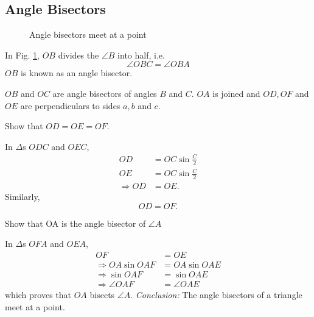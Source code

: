 \subsection{Angle Bisectors}

\begin{figure}[!ht]
	\begin{center}
		
		\resizebox{\columnwidth}{!}{}
	\end{center}
	\caption{Angle bisectors meet at a point}
	\label{ch3_angle_bisector}	
\end{figure}

\begin{definition}
	In Fig. \ref{ch3_angle_bisector}, $OB$ divides the  $\angle B$ into half, i.e.\begin{equation}
	\angle OBC = \angle OBA
	\end{equation}
	$OB$ is known as an angle bisector.
\end{definition}
	$OB$ and $OC$ are angle bisectors of angles $B$ and $C$. $OA$ is joined and $OD, OF$ and $OE$ are perpendiculars to sides $a,b$ and $c$.
\begin{problem}
  Show that $OD = OE = OF$.
\end{problem}
\proof In $\Delta$s $ODC$ and $OEC$,
\begin{align}
OD &= OC \sin \frac{C}{2}
\\
OE &= OC \sin \frac{C}{2} 
\\
\Rightarrow OD &=OE.
\end{align}
Similarly,
\begin{equation}
OD = OF.
\end{equation}
%
\begin{problem}
	Show that OA is the angle bisector of $\angle A$
\end{problem}
\proof In $\Delta$s $OFA$ and $OEA$,
\begin{align}
OF &= OE
\\
\Rightarrow OA \sin OAF &= OA \sin OAE \\
\Rightarrow \sin OAF &=  \sin OAE \\
\Rightarrow \angle OAF &= \angle OAE
\end{align}
which proves that $OA$ bisects $\angle A$.
{\em Conclusion:} The angle bisectors of a triangle meet at a point.


